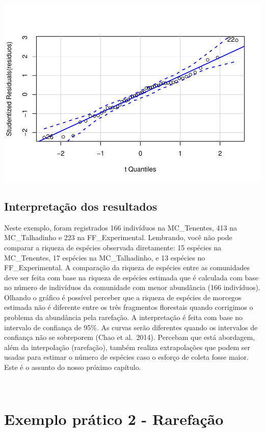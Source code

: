 \documentclass[
]{book}
\begin{document}
\includegraphics{livro_r_ecologia_files/figure-latex/unnamed-chunk-1-1.pdf}

\hypertarget{interpretauxe7uxe3o-dos-resultados}{%
\subsection{Interpretação dos resultados}\label{interpretauxe7uxe3o-dos-resultados}}

Neste exemplo, foram registrados 166 indivíduos na MC\_Tenentes, 413 na MC\_Talhadinho e 223 na FF\_Experimental. Lembrando, você não pode comparar a riqueza de espécies observada diretamente: 15 espécies na MC\_Tenentes, 17 espécies na MC\_Talhadinho, e 13 espécies no FF\_Experimental. A comparação da riqueza de espécies entre as comunidades deve ser feita com base na riqueza de espécies estimada que é calculada com base no número de indivíduos da comunidade com menor abundância (166 indivíduos). Olhando o gráfico é possível perceber que a riqueza de espécies de morcegos estimada não é diferente entre os três fragmentos florestais quando corrigimos o problema da abundância pela rarefação. A interpretação é feita com base no intervalo de confiança de 95\%. As curvas serão diferentes quando os intervalos de confiança não se sobreporem (Chao et al.~2014). Percebam que está abordagem, além da interpolação (rarefação), também realiza extrapolações que podem ser usadas para estimar o número de espécies caso o esforço de coleta fosse maior. Este é o assunto do nosso próximo capítulo.

~

\hypertarget{exemplo-pruxe1tico-2---rarefauxe7uxe3o}{%
\section{Exemplo prático 2 - Rarefação}\label{exemplo-pruxe1tico-2---rarefauxe7uxe3o}}
\end{document}
